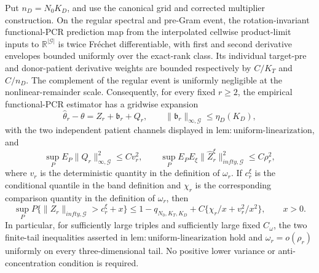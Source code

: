 Put \(n_D=N_0K_D\), and use the canonical grid and corrected multiplier construction. On the regular spectral and pre-Gram event, the rotation-invariant functional-PCR prediction map from the interpolated cellwise product-limit inputs to \(\mathbb R^{|\mathcal G|}\) is twice Fr\'echet differentiable, with first and second derivative envelopes bounded uniformly over the exact-rank class. Its individual target-pre and donor-patient derivative weights are bounded respectively by \(C/K_T\) and \(C/n_D\). The complement of the regular event is uniformly negligible at the nonlinear-remainder scale. Consequently, for every fixed \(r\ge2\), the empirical functional-PCR estimator has a gridwise expansion
\[
 \widehat\theta_r-\theta=Z_r+\mathfrak b_r+Q_r,
 \qquad
 \|\mathfrak b_r\|_{\infty,\mathcal G}\le\eta_D(K_D),
\]
with the two independent patient channels displayed in \(\mathrm{lem:uniform\mbox{-}linearization}\), and
\[
 \sup_PE_P\|Q_r\|_{\infty,\mathcal G}^2\le Cv_r^2,
 \qquad
 \sup_PE_PE_\xi\|\widehat Z_r^\xi\|_{infty,\mathcal G}^2\le C\rho_r^2,
\]
where \(v_r\) is the deterministic quantity in the definition of \(\omega_r\). If \(c_r^\xi\) is the conditional quantile in the band definition and \(\chi_r\) is the corresponding comparison quantity in the definition of \(\omega_r\), then
\[
 \sup_PP\{\|Z_r\|_{infty,\mathcal G}>c_r^\xi+x\}
 \le1-q_{N_0,K_T,K_D}+C\{\chi_r/x+v_r^2/x^2\},
 \qquad x>0.
\]
In particular, for sufficiently large triples and sufficiently large fixed \(C_\omega\), the two finite-tail inequalities asserted in \(\mathrm{lem:uniform\mbox{-}linearization}\) hold and \(\omega_r=o(\rho_r)\) uniformly on every three-dimensional tail. No positive lower variance or anti-concentration condition is required.